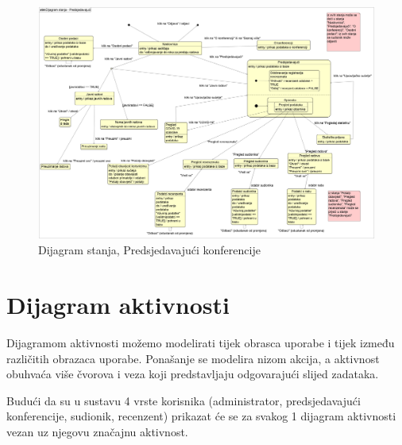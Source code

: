 			\begin{figure}[H]
				\includegraphics[height= 15 cm, width=15 cm]{dijagrami/Dijagram stanja - Predsjedavajuci.png} 
				\centering
				\caption{Dijagram stanja, Predsjedavajući konferencije}
				\label{fig:stanje4}
			\end{figure}
		
			
			
			
			
			
			
			
			\eject 
		
		\section{Dijagram aktivnosti}
			
			 Dijagramom aktivnosti možemo modelirati tijek obrasca uporabe i tijek između različitih obrazaca uporabe. Ponašanje se modelira nizom akcija, a aktivnost obuhvaća više čvorova i veza koji predstavljaju odgovarajući slijed zadataka.
			 
			 Budući da su u sustavu 4 vrste korisnika (administrator, predsjedavajući konferencije, sudionik, recenzent) prikazat će se za svakog 1 dijagram aktivnosti vezan uz njegovu značajnu aktivnost.
			 

